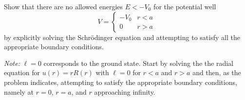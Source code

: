\documentclass[11pt]{hmcpset}
\begin{document}

\begin{problem}
	
	Show that there are no allowed energies $E < -V_0$ for the
	potential well
	\[
	V = \begin{cases}
	- V_{0}  & r < a  \\
	0  & r > a
	\end{cases}
	\]
	by explicitly solving the Schr\"{o}dinger equation and attempting to satisfy
	all the appropriate boundary conditions.
	
	\emph{Note:} $\ell = 0$ corresponds to the ground state. Start by solving the the radial equation for $u(r) = r R(r)$ with $\ell = 0$ for $r < a$ and $r > a$ and then, as the problem indicates, attempting to satisfy the appropriate boundary conditions, namely at $r = 0$, $r = a$, and $r$ approaching infinity.
	
\end{problem}
\begin{solution}
	\vfill
\end{solution}
\pagebreak



\end{document}
